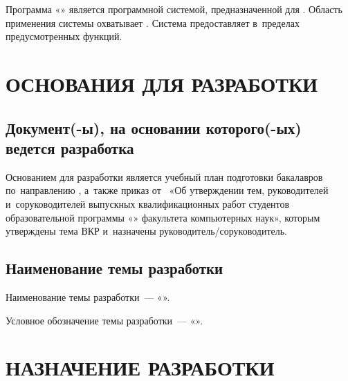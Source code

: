 \documentclass[12pt,a4paper]{extarticle}
\begin{document}
Программа «\projectname» является программной системой, предназначенной для . Область применения системы охватывает . Система предоставляет  в~пределах предусмотренных функций.

\clearpage

\section{ОСНОВАНИЯ ДЛЯ РАЗРАБОТКИ}

\subsection{Документ(-ы), на основании которого(-ых) ведется разработка}

Основанием для разработки является учебный план подготовки бакалавров по~направлению , а~также приказ от~ «Об утверждении тем, руководителей и~соруководителей выпускных квалификационных работ студентов образовательной программы «\hseSpecialization» факультета компьютерных наук», которым утверждены тема ВКР и~назначены руководитель/соруководитель.

\subsection{Наименование темы разработки}

Наименование темы разработки~--- «\projectname».

Условное обозначение темы разработки~--- «».

\clearpage

\section{НАЗНАЧЕНИЕ РАЗРАБОТКИ}
\end{document}
